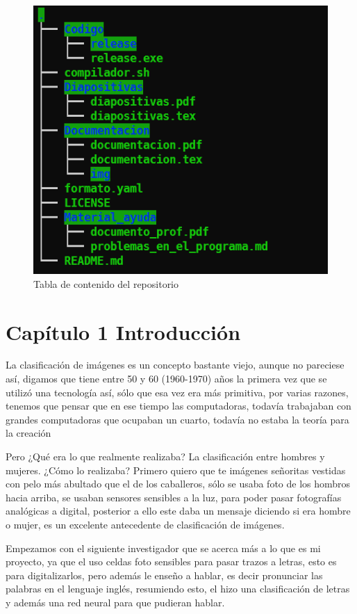 \documentclass[
  spanish,
]{article}
\begin{document}
\begin{figure}
\centering
\includegraphics{img/README/Screenshot_1.png}
\caption{Tabla de contenido del repositorio}
\end{figure}

\hypertarget{capuxedtulo-1-introducciuxf3n}{%
\section{Capítulo 1 Introducción}\label{capuxedtulo-1-introducciuxf3n}}

La clasificación de imágenes es un concepto bastante viejo, aunque no
pareciese así, digamos que tiene entre 50 y 60 (1960-1970) años la
primera vez que se utilizó una tecnología así, sólo que esa vez era más
primitiva, por varias razones, tenemos que pensar que en ese tiempo las
computadoras, todavía trabajaban con grandes computadoras que ocupaban
un cuarto, todavía no estaba la teoría para la creación

Pero ¿Qué era lo que realmente realizaba? La clasificación entre hombres
y mujeres. ¿Cómo lo realizaba? Primero quiero que te imágenes señoritas
vestidas con pelo más abultado que el de los caballeros, sólo se usaba
foto de los hombros hacia arriba, se usaban sensores sensibles a la luz,
para poder pasar fotografías analógicas a digital, posterior a ello este
daba un mensaje diciendo si era hombre o mujer, es un excelente
antecedente de clasificación de imágenes.

Empezamos con el siguiente investigador que se acerca más a lo que es mi
proyecto, ya que el uso celdas foto sensibles para pasar trazos a
letras, esto es para digitalizarlos, pero además le enseño a hablar, es
decir pronunciar las palabras en el lenguaje inglés, resumiendo esto, el
hizo una clasificación de letras y además una red neural para que
pudieran hablar.
\end{document}
